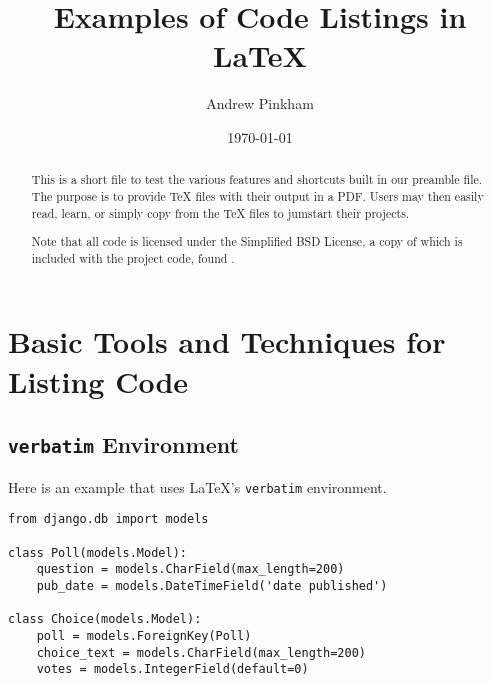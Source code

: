 


\title{Examples of Code Listings in \LaTeX{}}
\author{Andrew Pinkham} %
\date{\today}





\maketitle

\begin{abstract}
This is a short file to test the various features and shortcuts built in our preamble file. The purpose is to provide \TeX{} files with their output in a PDF. Users may then easily read, learn, or simply copy from the \TeX{} files to jumstart their projects.

Note that all code is licensed under the Simplified BSD License, a copy of which is included with the project code, found .
\end{abstract}

\begin{multicols}{2}
\tableofcontents
\columnbreak
\listoflistings
\end{multicols}

\section[Basic Techniques]{Basic Tools and Techniques for Listing Code}

\subsection{\texttt{verbatim} Environment}

Here is an example that uses \LaTeX 's \verb|verbatim| environment.

\begin{verbatim}
from django.db import models

class Poll(models.Model):
    question = models.CharField(max_length=200)
    pub_date = models.DateTimeField('date published')

class Choice(models.Model):
    poll = models.ForeignKey(Poll)
    choice_text = models.CharField(max_length=200)
    votes = models.IntegerField(default=0)
\end{verbatim}

